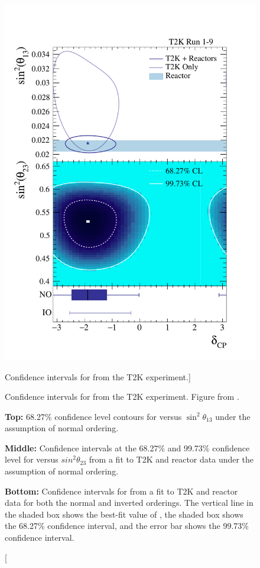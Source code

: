 \begin{figure}
	\centering
	\includegraphics[height=0.75\textheight]{figures/t2k_cp.pdf}
	\caption
	[Confidence intervals for \dcp{} from the T2K experiment.]
	{Confidence intervals for \dcp{} from the T2K experiment. Figure from 
	\cite{Abe2019}. 

	\medskip
	\textbf{Top:} 68.27\% confidence level contours for \dcp{} versus $\sin^2\theta_{13}$ 
	under the assumption of normal ordering.

	\medskip
	\textbf{Middle:} Confidence intervals at the 68.27\% and 99.73\% confidence level for 
	\dcp{} versus $sin^2\theta_{23}$ from a fit to T2K and reactor data under the 
	assumption of normal ordering.

	\medskip
	\textbf{Bottom:} Confidence intervals for \dcp{} from a fit to T2K and reactor data for 
	both the normal and inverted orderings. The vertical line in the shaded box 
	shows the best-fit value of \dcp{}, the shaded box shows the 68.27\% 
	confidence interval, and the error bar shows the 99.73\% confidence interval. 
	}

	\label{fig:t2k_cp}

\end{figure}

